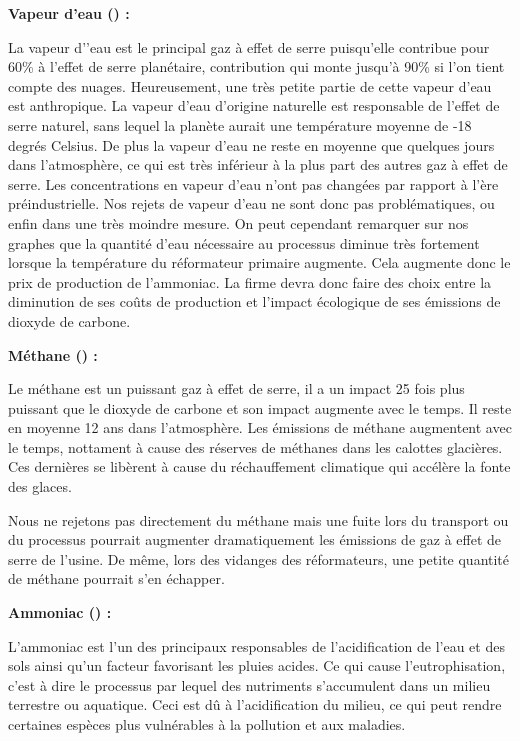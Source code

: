 \documentclass[a4paper, oneside, 12pt]{article}
\begin{document}
\textbf{Vapeur d'eau () : }

La vapeur d’’eau est le principal gaz à effet de serre puisqu’elle contribue pour 60\% à l’effet de serre planétaire, contribution qui monte jusqu’à 90\% si l’on tient compte des nuages. Heureusement, une très petite partie de cette vapeur d’eau est anthropique. La vapeur d’eau d’origine naturelle est responsable de l’effet de serre naturel, sans lequel la planète aurait une température moyenne de -18 degrés Celsius. De plus la vapeur d’eau ne reste en moyenne que quelques jours dans l’atmosphère, ce qui est très inférieur à la plus part des autres gaz à effet de serre. Les concentrations en vapeur d’eau n’ont pas changées par rapport à l’ère préindustrielle. Nos rejets de vapeur d’eau ne sont donc pas problématiques, ou enfin dans une très moindre mesure. On peut cependant remarquer sur nos graphes que la quantité d’eau nécessaire au processus diminue très fortement lorsque la température du réformateur primaire augmente. Cela augmente donc le prix de production de l’ammoniac. La firme devra donc faire des choix entre la diminution de ses coûts de production et l’impact écologique de ses émissions de dioxyde de carbone.  \newline

\textbf{Méthane () :}

Le méthane est un puissant gaz à effet de serre, il a un impact 25 fois plus puissant que le dioxyde de carbone et son impact augmente avec le temps. Il reste en moyenne 12 ans dans l’atmosphère. Les émissions de méthane augmentent avec le temps, nottament à cause des réserves de méthanes dans les calottes glacières. Ces dernières se libèrent à cause du réchauffement climatique qui accélère la fonte des glaces. 

Nous ne rejetons pas directement du méthane mais une fuite lors du transport ou du processus pourrait augmenter dramatiquement les émissions de gaz à effet de serre de l’usine.  De même, lors des vidanges des réformateurs, une petite quantité de méthane pourrait s’en échapper.  \newline


\textbf{Ammoniac () : }

L’ammoniac est l’un des principaux responsables de l’acidification de l’eau et des sols ainsi qu’un facteur favorisant les pluies acides. Ce qui cause l’eutrophisation, c’est à dire le processus par lequel des nutriments s’accumulent dans un milieu terrestre ou aquatique. Ceci est dû à l’acidification du milieu, ce qui peut rendre certaines espèces plus vulnérables à la pollution et aux maladies. 
	
\end{document}
